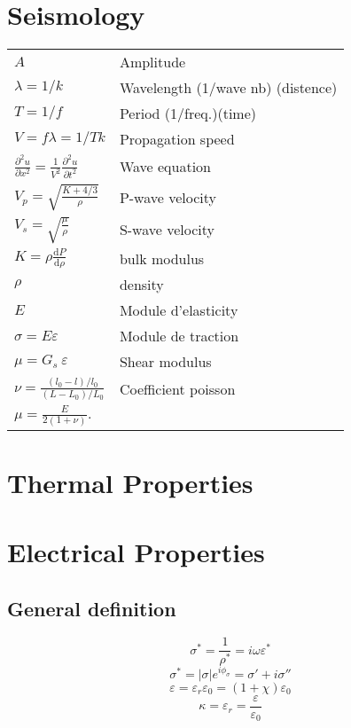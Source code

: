 \documentclass[twocolumn]{article}
\begin{document}
\section{Seismology}
\begin{tabular}{@{}ll@{}}
$A$ & Amplitude\\
$\lambda = 1/k$ & Wavelength (1/wave nb) (distence)\\
$T=1/f$ & Period (1/freq.)(time)\\
$V=f\lambda=1/Tk$&Propagation speed \\
$\frac{ \partial^2 u }{ \partial x^2 } = \frac{1}{V^2} \frac{ \partial^2 u }{ \partial  t^2 }$ & Wave equation\\
$V_p=\sqrt{\frac{K+4/3}{\rho}}$&P-wave velocity\\
$V_s=\sqrt{\frac{\mu}{\rho}}$&S-wave velocity\\
$K=\rho \frac{\mathrm d P}{\mathrm d \rho}$ & bulk modulus\\
$\rho$& density\\
$E$ & Module d'elasticity\\
$ \sigma = E \varepsilon$  & Module de traction \\
$\mu = G_s \ \varepsilon$ & Shear modulus\\
$ \nu = \frac{(l_0-l)/l_0}{(L-L_0)/L_0}$ & Coefficient poisson\\
$\mu = \frac {E}{2(1+\nu)}.$ &\\

\end{tabular}





\section{Thermal Properties}





\section{Electrical Properties}

\subsection{General definition}
\[ \sigma^* = \frac{1}{\rho^*}=i \omega \varepsilon^* \]
\[ \sigma^* = |\sigma|e^{i\phi_\sigma} =\sigma' +i\sigma''\]
\[ \varepsilon = \varepsilon_r\varepsilon_0=(1+\chi)\varepsilon_0\]
\[ \kappa=\varepsilon_r=\frac{\varepsilon}{\varepsilon_0}\]
\end{document}
